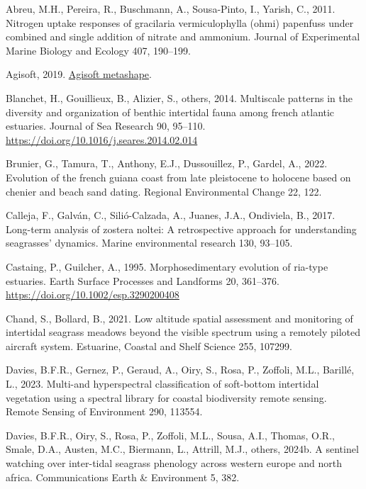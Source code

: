 \documentclass[
  letterpaper,
  DIV=11,
  numbers=noendperiod]{scrartcl}
\newlength{\cslhangindent}
\newenvironment{CSLReferences}[2] %
 {\begin{list}{}{%
  \setlength{\itemindent}{0pt}
  \setlength{\leftmargin}{0pt}
  \setlength{\parsep}{0pt}
  \ifodd #1
   \setlength{\leftmargin}{\cslhangindent}
   \setlength{\itemindent}{-1\cslhangindent}
  \fi
  \setlength{\itemsep}{#2\baselineskip}}}
 {\end{list}}
\begin{document}
\label{refs}
\begin{CSLReferences}{1}{0}
Abreu, M.H., Pereira, R., Buschmann, A., Sousa-Pinto, I., Yarish, C.,
2011. Nitrogen uptake responses of gracilaria vermiculophylla (ohmi)
papenfuss under combined and single addition of nitrate and ammonium.
Journal of Experimental Marine Biology and Ecology 407, 190--199.

Agisoft, 2019. \href{https://www.agisoft.com/}{Agisoft metashape}.

Blanchet, H., Gouillieux, B., Alizier, S., others, 2014. Multiscale
patterns in the diversity and organization of benthic intertidal fauna
among french atlantic estuaries. Journal of Sea Research 90, 95--110.
\url{https://doi.org/10.1016/j.seares.2014.02.014}

Brunier, G., Tamura, T., Anthony, E.J., Dussouillez, P., Gardel, A.,
2022. Evolution of the french guiana coast from late pleistocene to
holocene based on chenier and beach sand dating. Regional Environmental
Change 22, 122.

Calleja, F., Galván, C., Silió-Calzada, A., Juanes, J.A., Ondiviela, B.,
2017. Long-term analysis of zostera noltei: A retrospective approach for
understanding seagrasses' dynamics. Marine environmental research 130,
93--105.

Castaing, P., Guilcher, A., 1995. Morphosedimentary evolution of
ria-type estuaries. Earth Surface Processes and Landforms 20, 361--376.
\url{https://doi.org/10.1002/esp.3290200408}

Chand, S., Bollard, B., 2021. Low altitude spatial assessment and
monitoring of intertidal seagrass meadows beyond the visible spectrum
using a remotely piloted aircraft system. Estuarine, Coastal and Shelf
Science 255, 107299.

Davies, B.F.R., Gernez, P., Geraud, A., Oiry, S., Rosa, P., Zoffoli,
M.L., Barillé, L., 2023. Multi-and hyperspectral classification of
soft-bottom intertidal vegetation using a spectral library for coastal
biodiversity remote sensing. Remote Sensing of Environment 290, 113554.

Davies, B.F.R., Oiry, S., Rosa, P., Zoffoli, M.L., Sousa, A.I., Thomas,
O.R., Smale, D.A., Austen, M.C., Biermann, L., Attrill, M.J., others,
2024b. A sentinel watching over inter-tidal seagrass phenology across
western europe and north africa. Communications Earth \& Environment 5,
382.


\end{CSLReferences}
\end{document}
